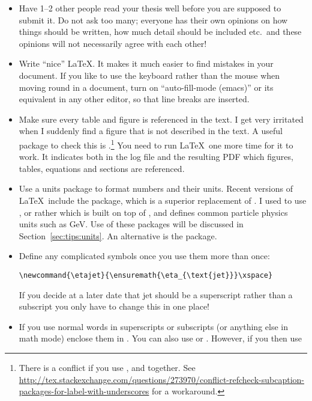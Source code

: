 \begin{itemize}
\item Have 1--2 other people read your thesis well before you are
  supposed to submit it. Do not ask too many; everyone has their own
  opinions on how things should be written, how much detail should be
  included etc.\ and these opinions will not necessarily agree with
  each other!
\item Write \enquote{nice} \LaTeX. It makes it much easier to find mistakes
  in your document. If you like to use the keyboard rather than the
  mouse when moving round in a document, turn on \enquote{auto-fill-mode
  (emacs)} or its equivalent in any other editor, so
  that line breaks are inserted.
\item Make sure every table and figure is referenced in the text. I
  get very irritated when I suddenly find a figure that is not
  described in the text. A useful package to check this is
  .\footnote{%
  There is a conflict if you use ,  and  together.
  See \url{http://tex.stackexchange.com/questions/273970/conflict-refcheck-subcaption-packages-for-label-with-underscores} for a workaround.}
  You need to run \LaTeX\ one more time for it to
  work. It indicates both in the log file and the resulting PDF which
  figures, tables, equations and sections are referenced.
\item Use a units package to format numbers and their units. Recent
  versions of \LaTeX\ include the  package, which
  is a superior replacement of . I used to
  use , or rather  which is
  built on top of , and defines common particle
  physics units such as \si{\GeV}. Use of these packages will be
  discussed in Section~\ref{sec:tips:units}. An alternative is the
   package.
\item Define any complicated symbols once you use them more than
  once:
\begin{verbatim}
\newcommand{\etajet}{\ensuremath{\eta_{\text{jet}}}\xspace}
\end{verbatim}
  If you decide at a later date that jet should be a superscript
  rather than a subscript you only have to change this in one place!
\item If you use normal words in superscripts or subscripts (or
  anything else in math mode) enclose them in . You can
  also use  or . However, if you then use

\end{itemize}
